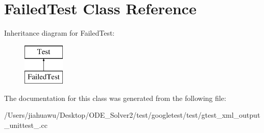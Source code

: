 \hypertarget{class_failed_test}{}\section{Failed\+Test Class Reference}
\label{class_failed_test}
Inheritance diagram for Failed\+Test\+:\begin{figure}[H]
\begin{center}
\leavevmode
\includegraphics[height=2.000000cm]{class_failed_test}
\end{center}
\end{figure}


The documentation for this class was generated from the following file\+:\begin{DoxyCompactItemize}
\item 
/\+Users/jiahuawu/\+Desktop/\+O\+D\+E\+\_\+\+Solver2/test/googletest/test/gtest\+\_\+xml\+\_\+output\+\_\+unittest\+\_\+.\+cc\end{DoxyCompactItemize}
